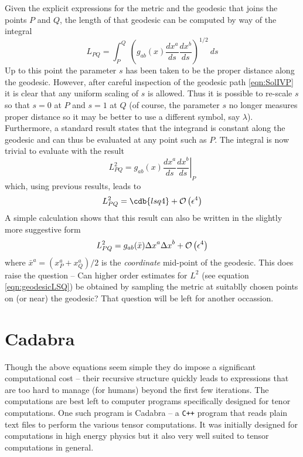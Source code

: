 \documentclass[a4paper,12pt]{article}
\numberwithin{equation}{section}
\begin{document}
Given the explicit expressions for the metric and the geodesic that joins the points $P$ and
$Q$, the length of that geodesic can be computed by way of the integral
\[
L_{PQ} = \int_P^Q\>\left(g_{ab}(x)\frac{dx^a}{ds}\frac{dx^b}{ds}\right)^{1/2}\>ds
\]
Up to this point the parameter $s$ has been taken to be the proper distance along the
geodesic. However, after careful inspection of the geodesic path \eqref{eqn:SolIVP} it is
clear that any uniform scaling of $s$ is allowed. Thus it is possible to re-scale $s$ so
that $s=0$ at $P$ and $s=1$ at $Q$ (of course, the parameter $s$ no longer measures proper
distance so it may be better to use a different symbol, say $\lambda$). Furthermore, a
standard result states that the integrand is constant along the geodesic and can thus be
evaluated at any point such as $P$. The integral is now trivial to evaluate with the result
\[
L^2_{PQ} = \left.g_{ab}(x)\frac{dx^a}{ds}\frac{dx^b}{ds}\right\vert_{P}
\]
which, using previous results, leads to
%
\begin{dmath*}L^2_{PQ} = \cdb{lsq4} + \BigO{\eps^4}\end{dmath*}
%
A simple calculation shows that this result can also be written in the slightly more
suggestive form
\[
L^2_{PQ} = g_{ab}(\bar x) {\Delta x}^a {\Delta x}^b + \mathcal{O}\left(\epsilon^4\right)
\]
where ${\bar x}^a = (x^a_P+x^a_Q)/2$ is the \emph{coordinate} mid-point of the geodesic.
This does raise the question -- Can higher order estimates for $L^2$ (see equation
\ref{eqn:geodesicLSQ}) be obtained by sampling the metric at suitablly chosen points on
(or near) the geodesic? That question will be left for another occassion.

\section{Cadabra}\label{sec:Cadabra}

Though the above equations seem simple they do impose a significant computational cost --
their recursive structure quickly leads to expressions that are too hard to manage (for
humans) beyond the first few iterations. The computations are best left to computer programs
specifically designed for tenor computations. One such program is Cadabra -- a {\tt C++}
program that reads plain text files to perform the various tensor computations. It was
initially designed for computations in high energy physics but it also very well suited to
tensor computations in general.
\end{document}
